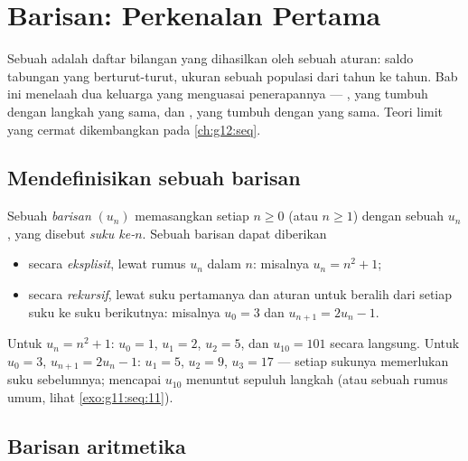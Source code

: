 \chapter{Barisan: Perkenalan Pertama}\label{ch:g11:seq}

Sebuah  adalah daftar bilangan yang dihasilkan oleh sebuah aturan: saldo
tabungan yang berturut-turut, ukuran sebuah populasi dari tahun ke tahun. Bab
ini menelaah dua keluarga yang menguasai penerapannya ---
 \emph{}, yang tumbuh dengan langkah yang sama, dan
 \emph{}, yang tumbuh dengan  yang sama. Teori limit yang
cermat dikembangkan pada \cref{ch:g12:seq}.

\section{Mendefinisikan sebuah barisan}

\begin{definition}[Barisan]\label{def:g11:seq:sequence}
Sebuah \emph{barisan} $(u_n)$ memasangkan setiap 
$n \geq 0$ (atau $n \geq 1$) dengan sebuah  $u_n$, yang disebut
\emph{suku ke-$n$}. Sebuah barisan dapat diberikan
\begin{itemize}
  \item secara \emph{eksplisit}, lewat rumus $u_n$ dalam $n$: misalnya
        $u_n = n^2 + 1$;
  \item secara \emph{rekursif}, lewat suku pertamanya dan aturan untuk beralih
        dari setiap suku ke suku berikutnya: misalnya $u_0 = 3$ dan $u_{n+1} = 2u_n - 1$.
\end{itemize}
\end{definition}

\begin{example}
Untuk $u_n = n^2 + 1$: $u_0 = 1$, $u_1 = 2$, $u_2 = 5$, dan $u_{10} = 101$
secara langsung. Untuk $u_0 = 3$, $u_{n+1} = 2u_n - 1$: $u_1 = 5$, $u_2 = 9$,
$u_3 = 17$ --- setiap sukunya memerlukan suku sebelumnya; mencapai $u_{10}$
menuntut sepuluh langkah (atau sebuah rumus umum, lihat \cref{exo:g11:seq:11}).
\end{example}

\section{Barisan aritmetika}

